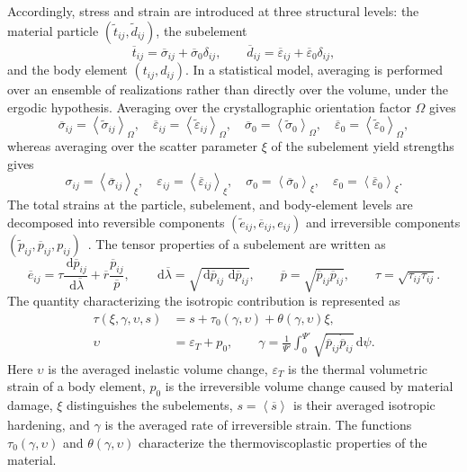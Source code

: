 \documentclass[11pt,a4paper]{article}
\numberwithin{equation}{section}
\newcommand{\avg}[2][]{\left\langle #2\right\rangle_{#1}}
\newcommand{\dd}{\,\mathrm{d}}
\begin{document}
Accordingly, stress and strain are introduced at three structural levels: the material particle $(\widetilde t_{ij},\widetilde d_{ij})$, the subelement
\[
 \overline t_{ij}=\overline\sigma_{ij}+\overline\sigma_0\delta_{ij},
 \qquad
 \overline d_{ij}=\overline\varepsilon_{ij}+\overline\varepsilon_0\delta_{ij},
\]
and the body element $(t_{ij},d_{ij})$. In a statistical model, averaging is performed over an ensemble of realizations rather than directly over the volume, under the ergodic hypothesis. Averaging over the crystallographic orientation factor $\Omega$ gives
\[
 \overline\sigma_{ij}=\avg[\Omega]{\widetilde\sigma_{ij}},\quad
 \overline\varepsilon_{ij}=\avg[\Omega]{\widetilde\varepsilon_{ij}},\quad
 \overline\sigma_0=\avg[\Omega]{\widetilde\sigma_0},\quad
 \overline\varepsilon_0=\avg[\Omega]{\widetilde\varepsilon_0},
\]
whereas averaging over the scatter parameter $\xi$ of the subelement yield strengths gives
\[
 \sigma_{ij}=\avg[\xi]{\overline\sigma_{ij}},\quad
 \varepsilon_{ij}=\avg[\xi]{\overline\varepsilon_{ij}},\quad
 \sigma_0=\avg[\xi]{\overline\sigma_0},\quad
 \varepsilon_0=\avg[\xi]{\overline\varepsilon_0}.
\]
The total strains at the particle, subelement, and body-element levels are decomposed into reversible components $(\widetilde e_{ij},\overline e_{ij},e_{ij})$ and irreversible components $(\widetilde p_{ij},\overline p_{ij},p_{ij})$~\cite{shevchenko1976,shevchenko1992,marina2024}. The tensor properties of a subelement are written as
\begin{equation}
 \overline e_{ij}
 =\tau\frac{\dd\overline p_{ij}}{\dd\overline\lambda}
  +\overline r\frac{\overline p_{ij}}{\overline p},
 \qquad
 \dd\overline\lambda
 =\sqrt{\dd\overline p_{ij}\,\dd\overline p_{ij}},
 \qquad
 \overline p=\sqrt{\overline p_{ij}\overline p_{ij}},
 \qquad
 \tau=\sqrt{\tau_{ij}\tau_{ij}}.
\end{equation}
The quantity characterizing the isotropic contribution is represented as~\cite{marina2024,marina1997}
\begin{equation}
\begin{aligned}
 \tau(\xi,\gamma,\upsilon,s)
 &=s+\tau_0(\gamma,\upsilon)+\theta(\gamma,\upsilon)\xi,\\
 \upsilon&=\varepsilon_T+p_0,
 \qquad
 \gamma=\frac{1}{\Psi'}\int_0^{\Psi'}
 \sqrt{\dot{\overline p}_{ij}\dot{\overline p}_{ij}}\dd\psi.
\end{aligned}
\end{equation}
Here $\upsilon$ is the averaged inelastic volume change, $\varepsilon_T$ is the thermal volumetric strain of a body element, $p_0$ is the irreversible volume change caused by material damage, $\xi$ distinguishes the subelements, $s=\avg{\overline s}$ is their averaged isotropic hardening, and $\gamma$ is the averaged rate of irreversible strain. The functions $\tau_0(\gamma,\upsilon)$ and $\theta(\gamma,\upsilon)$ characterize the thermoviscoplastic properties of the material.
\end{document}
